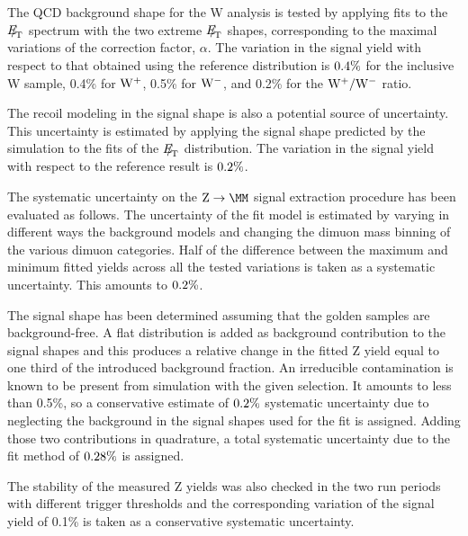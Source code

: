 The QCD background shape for the W analysis is tested by applying fits to the ${E\!\!\!/}_{\!\mathrm{T}}$ spectrum
with the two extreme ${E\!\!\!/}_{\!\mathrm{T}}$ shapes, corresponding to the maximal variations of the correction 
factor, $\alpha$. The variation in the signal yield with respect to that obtained using the reference 
distribution is $ 0.4 \%$  for the inclusive W sample, 0.4\% for $\mathrm{W^+}$, 0.5\% for $\mathrm{W^-}$, 
and 0.2\% for the $\mathrm{W^+}/\mathrm{W^-}$ ratio.

The recoil modeling in the signal shape is also a potential source of
uncertainty. This uncertainty is estimated by applying the signal shape predicted by the simulation
to the fits of the ${E\!\!\!/}_{\!\mathrm{T}}$ distribution. The variation in the signal
yield with respect to the reference result is $ 0.2 \%$.

The systematic uncertainty on the $\Zmm$ signal extraction procedure 
 has been evaluated as follows. The
uncertainty of the fit model is estimated by varying in different ways the background models 
and changing the dimuon mass binning of the various dimuon categories.
Half of the difference between the maximum and minimum fitted yields across all the tested variations
is taken as a systematic uncertainty. This amounts to $ 0.2 \%$.

The signal shape has been determined assuming that the golden
samples are background-free.
A flat distribution is added as background contribution to the signal shapes
and this produces a relative change in the fitted Z yield 
equal to one third of the introduced background fraction.
An irreducible contamination is known to be present from simulation with the given selection.
It amounts to less than 0.5\%, so a conservative estimate of $ 0.2 \%$
systematic uncertainty due to neglecting the background
in the signal shapes used for the fit is assigned.
Adding those two contributions in quadrature, a total 
systematic uncertainty due to the fit method of
$ 0.28 \%$ is assigned. 

The stability of the measured Z yields was also checked in 
the two run periods with different trigger thresholds and
the corresponding variation of the signal yield of 0.1\% is taken as
a conservative systematic uncertainty.

